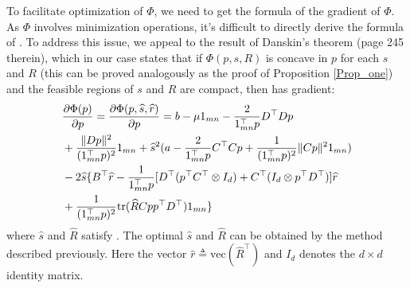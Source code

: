 \documentclass[11pt,bezier,]{article}
\begin{document}
To facilitate  optimization of $\Phi$, %
we need to get  the formula of the gradient of $\Phi$. 
As  $\Phi$ involves minimization operations, %
it's difficult to directly derive the formula of .
To address this issue,
we appeal to the result of Danskin's theorem \cite{cov_analysis} (page 245 therein), 
which in our case states that if $\Phi(p,s,R)$ is concave in $p$ for each $s$ and $R$
(this can be proved  analogously as the proof of Proposition \ref{Prop_one})
and the feasible regions of $s$ and $R$ are compact,
then 
has gradient:
\begin{align}
&\frac{\partial\Phi(p)}{\partial p}= \frac{\partial\Phi(p,\widehat s,\widehat r)}{\partial p}=         %
b -\mu 1_{mn} 
-\frac{2}{1_{mn}^\top p} D^\top D p    \notag\\
&+\frac{\|Dp\|^2 }{(1_{mn}^\top p)^2}1_{mn} 
+  \widehat s^2 ( a    - \frac{2}{1_{mn}^\top p}   C^\top C  p  + \frac{1}{(1_{mn}^\top p)^2}    \| C  p \|^2 1_{mn})  \notag\\
&- 2\widehat s \{ B^\top \widehat r  -  \frac{1}{1_{mn}^\top p}  [D^\top (p^\top C^\top  \otimes I_d) + C^\top(I_d\otimes p^\top D^\top) ] \widehat r \notag\\
&+ \frac{1}{(1_{mn}^\top p)^2} \text{tr}( \widehat R  C p  p^\top D^\top ) 1_{mn} 
\}  \label{gradient_exp}
\end{align}
where  $\widehat s$ and $\widehat R$ 
satisfy
.
The optimal $\widehat s$ and $\widehat R$ can be obtained by the method described previously. %
Here the vector $\widehat r\triangleq\text{vec}(\widehat R^\top)$ and
$I_{d}$ denotes the $d\times d$ identity matrix.



% 
\end{document}
